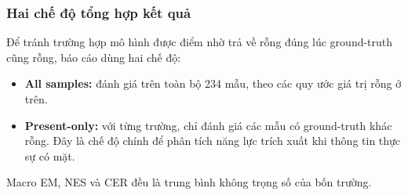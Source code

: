 \subsubsection{Hai chế độ tổng hợp kết quả}
Để tránh trường hợp mô hình được điểm nhờ trả về rỗng đúng lúc ground-truth cũng rỗng, báo cáo dùng hai chế độ:
\begin{itemize}
  \item \textbf{All samples:} đánh giá trên toàn bộ 234 mẫu, theo các quy ước giá trị rỗng ở trên.
  \item \textbf{Present-only:} với từng trường, chỉ đánh giá các mẫu có ground-truth khác rỗng. Đây là chế độ chính để phân tích năng lực trích xuất khi thông tin thực sự có mặt.
\end{itemize}
Macro EM, NES và CER đều là trung bình không trọng số của bốn trường.
